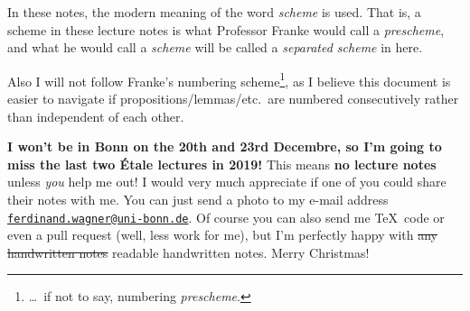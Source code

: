 \documentclass[a4paper, 10pt, oneside, DIV=9, chapterprefix=true, numbers=enddot, bibliography=totoc]{scrbook}
\begin{document}
In these notes, the modern meaning of the word \emph{scheme} is used. That is, a scheme in these lecture notes is what Professor Franke would call a \emph{prescheme}, and what he would call a \emph{scheme} will be called a \emph{separated scheme} in here.

Also I will not follow Franke's numbering scheme\footnote{\ldots\ if not to say, numbering \emph{prescheme}.}, as I believe this document is easier to navigate if propositions/lemmas/etc.\ are numbered consecutively rather than independent of each other. 

\textbf{I won't be in Bonn on the 20th and 23rd Decembre, so I'm going to miss the last two Étale lectures in 2019!}
This means \textbf{no lecture notes} \dotso unless \emph{you} help me out! I would very much appreciate if one of you could share their notes with me. You can just send a photo to my e-mail address \href{mailto:ferdinand.wagner@uni-bonn.de}{\texttt{ferdinand.wagner@uni-bonn.de}}. Of course you can also send me \TeX\ code or even a pull request (well, less work for me), but I'm perfectly happy with \sout{any handwritten notes} readable handwritten notes. Merry Christmas!

\mainmatter{}

\end{document}
